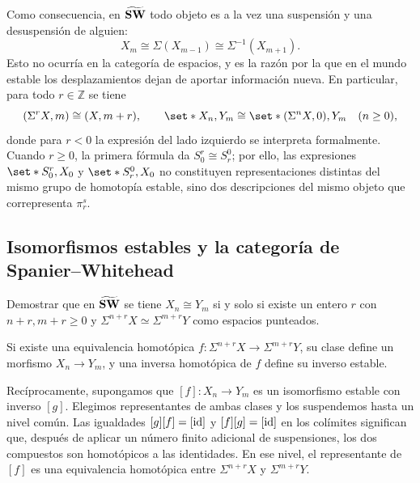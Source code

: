 Como consecuencia, en $\widetilde{\mathbf{SW}}$ todo objeto es a la vez una suspensión y una desuspensión de alguien:
\[
X_m\cong\Sigma(X_{m-1})\cong\Sigma^{-1}(X_{m+1}).
\]
Esto no ocurría en la categoría de espacios, y es la razón por la que en el mundo estable los desplazamientos dejan de aportar información nueva. En particular, para todo $r\in\mathbb Z$ se tiene
\[
(\Sigma^rX,m)\cong(X,m+r),\qquad
\set*{X_n,Y_m}\cong\set*{(\Sigma^nX,0),Y_m}\quad(n\ge0),
\]
donde para $r<0$ la expresión del lado izquierdo se interpreta formalmente. Cuando $r\geq0$, la primera fórmula da $S^r_0\cong S^0_r$; por ello, las expresiones $\set*{S^r_0,X_0}$ y $\set*{S^0_r,X_0}$ no constituyen representaciones distintas del mismo grupo de homotopía estable, sino dos descripciones del mismo objeto que correpresenta $\pi_r^s$.

\subsection{Isomorfismos estables y la categoría de Spanier--Whitehead}
\begin{ejer}
Demostrar que en $\widetilde{\mathbf{SW}}$ se tiene $X_n\cong Y_m$ si y solo si existe un entero $r$ con $n+r,m+r\geq0$ y $\Sigma^{n+r}X\simeq\Sigma^{m+r}Y$ como espacios punteados.
\end{ejer}

\begin{sol}
Si existe una equivalencia homotópica $f\colon\Sigma^{n+r}X\to\Sigma^{m+r}Y$, su clase define un morfismo $X_n\to Y_m$, y una inversa homotópica de $f$ define su inverso estable.

Recíprocamente, supongamos que $[f]\colon X_n\to Y_m$ es un isomorfismo estable con inverso $[g]$. Elegimos representantes de ambas clases y los suspendemos hasta un nivel común. Las igualdades $[g][f]=[\operatorname{id}]$ y $[f][g]=[\operatorname{id}]$ en los colímites significan que, después de aplicar un número finito adicional de suspensiones, los dos compuestos son homotópicos a las identidades. En ese nivel, el representante de $[f]$ es una equivalencia homotópica entre $\Sigma^{n+r}X$ y $\Sigma^{m+r}Y$.
\end{sol}

